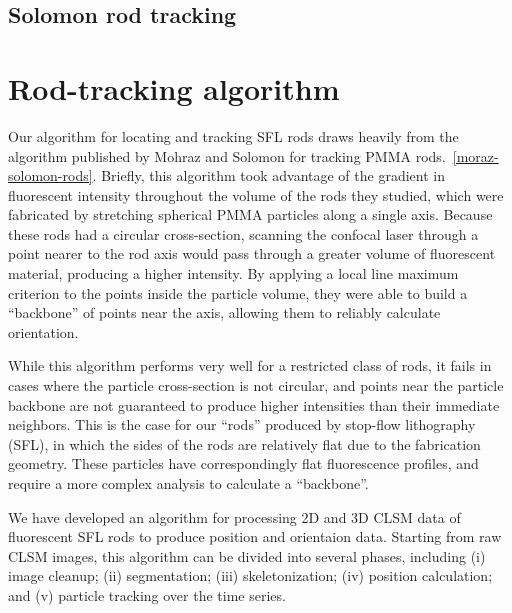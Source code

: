 \subsection{Solomon rod tracking}

\begin{itemize}
\end{itemize}

\section{Rod-tracking algorithm}

Our algorithm for locating and tracking SFL rods draws heavily from the algorithm published by 
Mohraz and Solomon for tracking PMMA rods.~\ref{moraz-solomon-rods}.  Briefly, this algorithm 
took advantage of the gradient in fluorescent intensity throughout the volume of the 
rods they studied, which were fabricated by stretching spherical PMMA particles along a single axis.
Because these rods had a circular cross-section, scanning the confocal laser through a point nearer
to the rod axis would pass through a greater volume of fluorescent material, producing a higher intensity.
By applying a local line maximum criterion to the points inside the particle volume, they were able to 
build a ``backbone'' of points near the axis, allowing them to reliably calculate orientation.

While this algorithm performs very well for a restricted class of rods, it fails in cases where the particle
cross-section is not circular, and points near the particle backbone are not guaranteed to produce higher 
intensities than their immediate neighbors.  This is the case for our ``rods'' produced by stop-flow
lithography (SFL), in which the sides of the rods are relatively flat due to the fabrication
geometry. These particles have correspondingly flat fluorescence profiles, and require a more complex analysis
to calculate a ``backbone''.

We have developed an algorithm for processing 2D and 3D CLSM data of fluorescent SFL rods to
produce position and orientaion data.  Starting from raw CLSM images, this algorithm can be divided
into several phases, including (i) image cleanup; (ii) segmentation; (iii) skeletonization;
(iv) position calculation; and
(v) particle tracking over the time series.  

